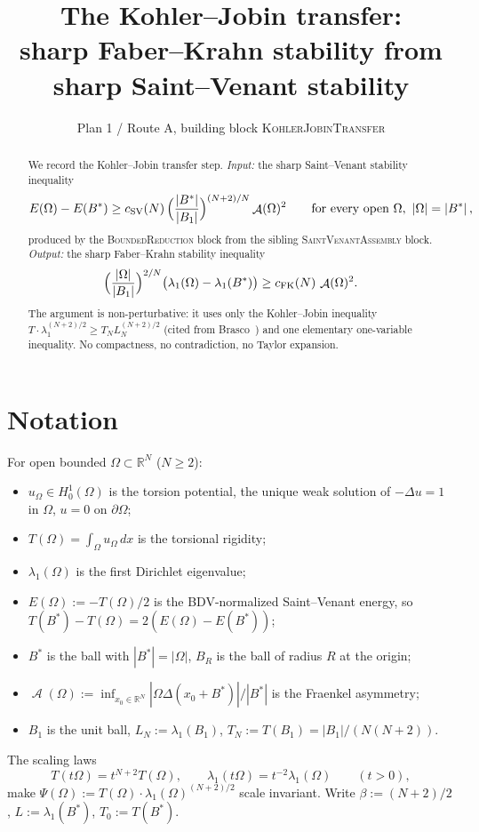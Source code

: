 \documentclass[11pt]{article}
\title{The Kohler--Jobin transfer:\\
sharp Faber--Krahn stability from sharp Saint--Venant stability}
\author{Plan 1 / Route A, building block \textsc{KohlerJobinTransfer}}
\date{}
\theoremstyle{definition}
\newcommand{\R}{\mathbb{R}}
\newcommand{\abs}[1]{\left|#1\right|}
\newcommand{\dx}{\,dx}
\DeclareMathOperator{\Asym}{\mathcal{A}}
\begin{document}
\maketitle

\begin{abstract}
We record the Kohler--Jobin transfer step.
\emph{Input:} the sharp Saint--Venant stability inequality
\[
E(\Omega)-E(B^*)\ge c_{\mathrm{SV}}(N)\,
\Bigl(\frac{|B^*|}{|B_1|}\Bigr)^{(N+2)/N}\Asym(\Omega)^{2}
\qquad\text{for every open }\Omega,\ \abs{\Omega}=\abs{B^*},
\]
produced by the \textsc{BoundedReduction} block from the sibling
\textsc{SaintVenantAssembly} block.
\emph{Output:} the sharp Faber--Krahn stability inequality
\[
\Bigl(\frac{|\Omega|}{|B_1|}\Bigr)^{2/N}
\bigl(\lambda_1(\Omega)-\lambda_1(B^*)\bigr)
\ge c_{\mathrm{FK}}(N)\,\Asym(\Omega)^{2}.
\]
The argument is non-perturbative: it uses only the Kohler--Jobin
inequality $T\cdot\lambda_1^{(N+2)/2}\ge T_N L_N^{(N+2)/2}$ (cited from
Brasco~\cite{Brasco2014}) and one elementary one-variable inequality.
No compactness, no contradiction, no Taylor expansion.
\end{abstract}

\section{Notation}\label{sec:notation}

For open bounded $\Omega\subset\R^N$ ($N\ge2$):
\begin{itemize}
\item $u_\Omega\in H_0^1(\Omega)$ is the torsion potential, the unique
weak solution of $-\Delta u=1$ in $\Omega$, $u=0$ on $\partial\Omega$;
\item $T(\Omega)=\int_\Omega u_\Omega\dx$ is the torsional rigidity;
\item $\lambda_1(\Omega)$ is the first Dirichlet eigenvalue;
\item $E(\Omega):=-T(\Omega)/2$ is the BDV-normalized Saint--Venant
energy, so $T(B^*)-T(\Omega)=2(E(\Omega)-E(B^*))$;
\item $B^*$ is the ball with $|B^*|=|\Omega|$, $B_R$ is the ball of
radius $R$ at the origin;
\item $\Asym(\Omega):=\inf_{x_0\in\R^N}|\Omega\Delta(x_0+B^*)|/|B^*|$ is
the Fraenkel asymmetry;
\item $B_1$ is the unit ball, $L_N:=\lambda_1(B_1)$, $T_N:=T(B_1)=|B_1|/(N(N+2))$.
\end{itemize}

The scaling laws
\begin{equation}\label{eq:scaling}
T(t\Omega)=t^{N+2}T(\Omega),\qquad
\lambda_1(t\Omega)=t^{-2}\lambda_1(\Omega)\qquad(t>0),
\end{equation}
make $\Psi(\Omega):=T(\Omega)\cdot\lambda_1(\Omega)^{(N+2)/2}$ scale
invariant. Write $\beta:=(N+2)/2$, $L:=\lambda_1(B^*)$, $T_0:=T(B^*)$.
\end{document}
